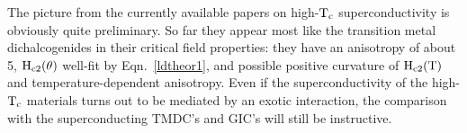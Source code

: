         The picture from the currently  available papers  on high-$\rm T_c$
superconductivity is obviously quite preliminary.  So far  they appear most
like  the   transition metal  dichalcogenides  in    their  critical  field
properties: they have an   anisotropy  of about  5,  $\rm   H_{c2}(\theta)$
well-fit  by Eqn.~\ref{ldtheor1}, and possible  positive  curvature of $\rm
H_{c2}(T)$    and    temperature-dependent   anisotropy.       Even if  the
superconductivity of the high-$\rm T_c$  materials turns out to be mediated
by an  exotic interaction,  the comparison with the  superconducting TMDC's
and GIC's will still be instructive.
